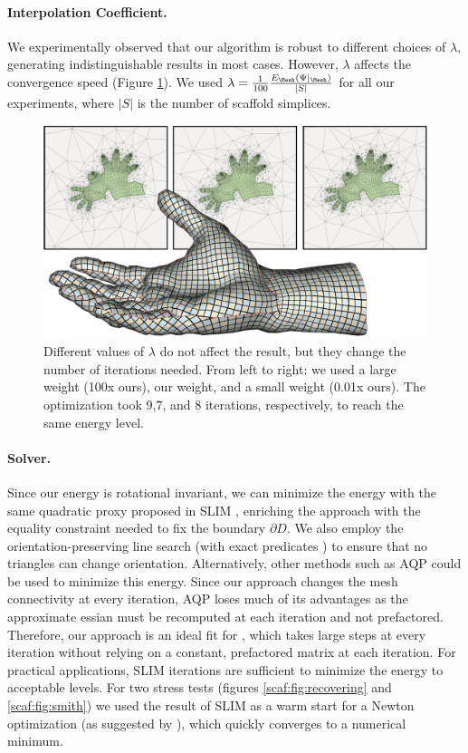\paragraph{Interpolation Coefficient.}
We experimentally observed that our algorithm is robust to different choices of $\lambda$, generating indistinguishable results in most cases. However, $\lambda$ affects the convergence speed (Figure \ref{scaf:fig:different_weight}). We used $\lambda = \frac{1}{100}\frac{ E_{\Mesh}(\Psi|_{\Mesh})}{|S|}$ for all our experiments, where $|S|$ is the number of scaffold simplices.

\begin{figure}[h!]
\centering
    \includegraphics[width = \columnwidth]{figs/hand_weight}
\caption{Different values of $\lambda$ do not affect the result, but they change the number of iterations needed. From left to right: we used a large weight (100x ours), our weight, and a small weight (0.01x ours). The optimization took 9,7, and 8 iterations, respectively, to reach the same energy level.}
\label{scaf:fig:different_weight}
\end{figure}

\paragraph{Solver.}
Since our energy is rotational invariant, we can minimize the energy with the same quadratic proxy proposed in SLIM \cite{Rabinovich:2017}, enriching the approach with the equality constraint needed to fix the boundary $\partial D$. We also employ the orientation-preserving line search \cite{Smith:2015} (with exact predicates \cite{Shewchuk:1996}) to ensure that no triangles can change orientation. Alternatively, other methods such as AQP \cite{Kovalsky:2016} could be used to minimize this energy. Since our approach changes the mesh connectivity at every iteration, AQP loses much of its advantages as the approximate essian must be recomputed at each iteration and not prefactored.  Therefore, our approach is an ideal fit for \cite{Rabinovich:2017}, which takes large steps at every iteration without relying on a constant, prefactored matrix at each iteration. For practical applications, SLIM iterations are sufficient to minimize the energy to acceptable levels. For two  stress tests (figures \ref{scaf:fig:recovering} and \ref{scaf:fig:smith}) we used the result of SLIM as a warm start for a Newton optimization (as suggested by \cite{Rabinovich:2017}), which quickly converges to a numerical minimum.

